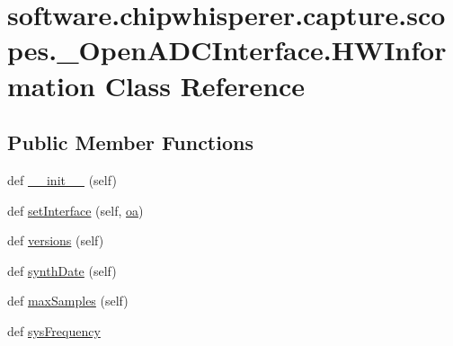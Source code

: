 \hypertarget{classsoftware_1_1chipwhisperer_1_1capture_1_1scopes_1_1__OpenADCInterface_1_1HWInformation}{}\section{software.\+chipwhisperer.\+capture.\+scopes.\+\_\+\+Open\+A\+D\+C\+Interface.\+H\+W\+Information Class Reference}
\label{classsoftware_1_1chipwhisperer_1_1capture_1_1scopes_1_1__OpenADCInterface_1_1HWInformation}
\subsection*{Public Member Functions}
\begin{DoxyCompactItemize}
\item 
def \hyperlink{classsoftware_1_1chipwhisperer_1_1capture_1_1scopes_1_1__OpenADCInterface_1_1HWInformation_a5c047a20d20051f483518bf4f9d2809e}{\+\_\+\+\_\+init\+\_\+\+\_\+} (self)
\item 
def \hyperlink{classsoftware_1_1chipwhisperer_1_1capture_1_1scopes_1_1__OpenADCInterface_1_1HWInformation_a7fddde7a60003c6348346a2e3c1c620d}{set\+Interface} (self, \hyperlink{classsoftware_1_1chipwhisperer_1_1capture_1_1scopes_1_1__OpenADCInterface_1_1HWInformation_a10e3d20fa6064a5f32791c5bc518f6c5}{oa})
\item 
def \hyperlink{classsoftware_1_1chipwhisperer_1_1capture_1_1scopes_1_1__OpenADCInterface_1_1HWInformation_a53e48933be74d23437cb55eebcbe9372}{versions} (self)
\item 
def \hyperlink{classsoftware_1_1chipwhisperer_1_1capture_1_1scopes_1_1__OpenADCInterface_1_1HWInformation_ab7bfa449654b8d893de6b5cead0eba67}{synth\+Date} (self)
\item 
def \hyperlink{classsoftware_1_1chipwhisperer_1_1capture_1_1scopes_1_1__OpenADCInterface_1_1HWInformation_ac65579d1f5d2b87e4a727f3b3a34a72b}{max\+Samples} (self)
\item 
def \hyperlink{classsoftware_1_1chipwhisperer_1_1capture_1_1scopes_1_1__OpenADCInterface_1_1HWInformation_ae46ff1052496d257643b0f523f1ea516}{sys\+Frequency}
\end{DoxyCompactItemize}

